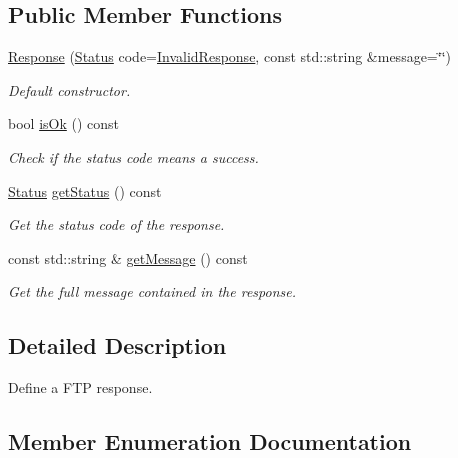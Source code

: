 \subsection*{Public Member Functions}
\begin{DoxyCompactItemize}
\item 
\hyperlink{classsf_1_1_ftp_1_1_response_af300fffd4862774102f978eb22f85d9b}{Response} (\hyperlink{classsf_1_1_ftp_1_1_response_af81738f06b6f571761696291276acb3b}{Status} code=\hyperlink{classsf_1_1_ftp_1_1_response_af81738f06b6f571761696291276acb3ba59e041e4ef186e8ae8d6035973fc46bd}{Invalid\+Response}, const std\+::string \&message=\char`\"{}\char`\"{})
\begin{DoxyCompactList}\small\item\em Default constructor. \end{DoxyCompactList}\item 
bool \hyperlink{classsf_1_1_ftp_1_1_response_a5102552955a2652c1a39e9046e617b36}{is\+Ok} () const
\begin{DoxyCompactList}\small\item\em Check if the status code means a success. \end{DoxyCompactList}\item 
\hyperlink{classsf_1_1_ftp_1_1_response_af81738f06b6f571761696291276acb3b}{Status} \hyperlink{classsf_1_1_ftp_1_1_response_a52bbca9fbf5451157bc055e3d8430c25}{get\+Status} () const
\begin{DoxyCompactList}\small\item\em Get the status code of the response. \end{DoxyCompactList}\item 
const std\+::string \& \hyperlink{classsf_1_1_ftp_1_1_response_a4af82a0b3620c90558390e1f600abc05}{get\+Message} () const
\begin{DoxyCompactList}\small\item\em Get the full message contained in the response. \end{DoxyCompactList}\end{DoxyCompactItemize}


\subsection{Detailed Description}
Define a F\+TP response. 

\subsection{Member Enumeration Documentation}
\mbox{\label{classsf_1_1_ftp_1_1_response_af81738f06b6f571761696291276acb3b}} 
